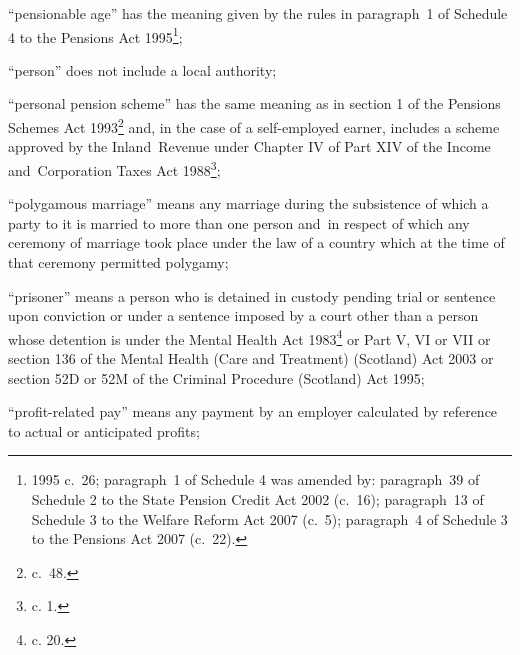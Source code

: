 \documentclass[12pt,a4paper]{article}
\begin{document}
\begin{enumerate}
“pensionable age” has the meaning given by the rules in paragraph~1 of Schedule 4 to the Pensions Act 1995\footnote{1995 c.~26; paragraph~1 of Schedule 4 was amended by: paragraph~39 of Schedule 2 to the State Pension Credit Act 2002  (c.~16); paragraph~13 of Schedule 3 to the Welfare Reform Act 2007 (c.~5); paragraph~4 of Schedule 3 to the Pensions Act 2007 (c.~22).};

“person” does not include a local authority;

“personal pension scheme” has the same meaning as in 
section 1 of the Pensions Schemes Act 1993\footnote{ c.~48.}  %
and, in the case of a self-employed earner, includes a scheme approved by the Inland~Revenue under Chapter IV of Part XIV of the Income and~Corporation Taxes Act 1988\footnote{ c. 1.};

“polygamous marriage” means any marriage during the subsistence of which a party to it is married to more than one person and~in respect of which any ceremony of marriage took place under the law of a country which at the time of that ceremony permitted polygamy;


“prisoner” means a person who is detained in custody pending trial or sentence upon conviction or under a sentence imposed by a court other than a person whose detention is under the Mental Health Act 1983\footnote{ c. 20.} or 
Part V, VI or VII or section 136 of the Mental Health (Care and Treatment) (Scotland) Act 2003 or section 52D or 52M of the Criminal Procedure (Scotland) Act 1995;  %

“profit-related pay” means any payment by an employer calculated by reference to actual or anticipated profits;


\end{enumerate}
\end{document}
